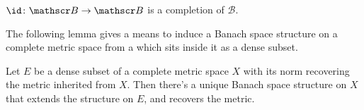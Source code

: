 	
	\begin{cor}
		$\id\colon\mathscr B\to\mathscr B$ is a completion of $\mathscr B$.
	\end{cor}
	
	
	The following lemma gives a means to induce a Banach space structure on a complete metric space from a \NLS which sits inside it as a dense subset.
	
	\begin{lem}\label{LEM: endowing a Banach space structure on a complete metr sp given an NLS structure on a dense subset}
		Let $E$ be a dense subset of a complete metric space $X$ with its norm recovering the metric inherited from $X$. Then there's a unique Banach space structure on $X$ that extends the \NLS structure on $E$, and recovers the metric.
	\end{lem}
	
